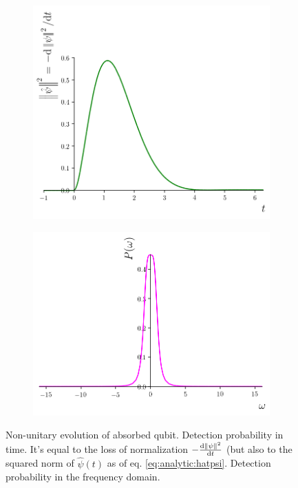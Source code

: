 \begin{figure}
  \centering
  \begin{subfigure}[b]{0.49\textwidth}
    \includegraphics[width=\linewidth]{img/2ldetect/qubit_normalization_loss.png}
    \subcaption{}\label{fig:absorbed-qubit-normalization-loss:t}
  \end{subfigure}
  \begin{subfigure}[b]{0.49\textwidth}
    \includegraphics[width=\linewidth]{img/2ldetect/P_omega.png}
    \subcaption{}\label{fig:absorbed-qubit-normalization-loss:omega}
  \end{subfigure}
  \caption{
    Non-unitary evolution of absorbed qubit.
      Detection probability in time. It's equal to the
      loss of normalization $-\dv{\norm{\psi}^2}{t}$
      (but also to the squared norm of $\hat{\psi}(t)$ as of eq. \eqref{eq:analytic:hatpsi}.
      Detection probability in the frequency domain.
  }
  \label{fig:absorbed-qubit-normalization-loss}
\end{figure}

